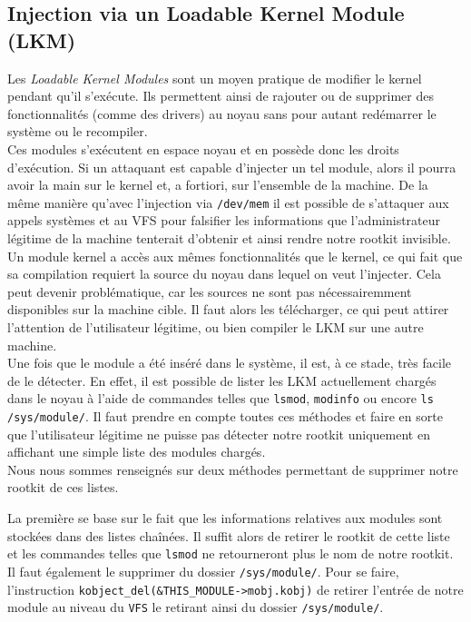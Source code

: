 \documentclass[11pt]{article}
\begin{document}
	\subsection{Injection via un Loadable Kernel Module (LKM)}

		Les \textit{Loadable Kernel Modules} sont un moyen pratique de modifier le kernel pendant qu'il s'exécute. Ils permettent ainsi de rajouter ou de supprimer des fonctionnalités (comme des drivers) au noyau sans pour autant redémarrer le système ou le recompiler. \\
		
		Ces modules s'exécutent en espace noyau et en possède donc les droits d'exécution. Si un attaquant est capable d'injecter un tel module, alors il pourra avoir la main sur le kernel et, a fortiori, sur l'ensemble de la machine. De la même manière qu'avec l'injection via \texttt{/dev/mem} il est possible de s'attaquer aux appels systèmes et au VFS pour falsifier les informations que l'administrateur légitime de la machine tenterait d'obtenir et ainsi rendre notre rootkit invisible. \\
		
		Un module kernel a accès aux mêmes fonctionnalités que le kernel, ce qui fait que sa compilation requiert la source du noyau dans lequel on veut l'injecter. Cela peut devenir problématique, car les sources ne sont pas nécessairemment disponibles sur la machine cible. Il faut alors les télécharger, ce qui peut attirer l'attention de l'utilisateur légitime, ou bien compiler le LKM sur une autre machine. \\
		
		Une fois que le module a été inséré dans le système, il est, à ce stade, très facile de le détecter. En effet, il est possible de lister les LKM actuellement chargés dans le noyau à l'aide de commandes telles que \texttt{lsmod}, \texttt{modinfo} ou encore \texttt{ls /sys/module/}. Il faut prendre en compte toutes ces méthodes et faire en sorte que l'utilisateur légitime ne puisse pas  détecter notre rootkit uniquement en affichant une simple liste des modules chargés. \\

		Nous nous sommes renseignés sur deux méthodes permettant de supprimer notre rootkit de ces listes.

		La première se base sur le fait que les informations relatives aux modules sont stockées dans des listes chaînées. Il suffit alors de retirer le rootkit de cette liste et les commandes telles que \texttt{lsmod} ne retourneront plus le nom de notre rootkit. Il faut également le supprimer du dossier \texttt{/sys/module/}. Pour se faire, l'instruction \texttt{kobject\_del(\&THIS\_MODULE->mobj.kobj)} de retirer l'entrée de notre module au niveau du \texttt{VFS} le retirant ainsi du dossier \texttt{/sys/module/}.
		
\end{document}
